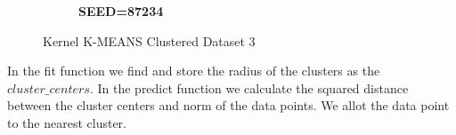 \documentclass[11pt]{article}
\begin{document}
\begin{figure}[H]
\begin{subfigure}{0.33\linewidth}
        \caption{\textbf{SEED=87234}}
    \end{subfigure} 
    \caption{Kernel K-MEANS Clustered Dataset 3}   
\end{figure}

In the fit function we find and store the radius of the clusters as the $cluster\_centers$. In the predict function we calculate the squared distance between the cluster centers and norm of the data points. We allot the data point to the nearest cluster. 
\end{document}
